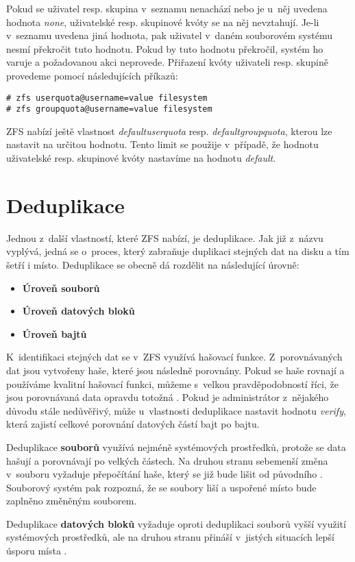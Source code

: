 Pokud se uživatel resp. skupina v~seznamu nenachází nebo je u~něj uvedena hodnota \emph{none}, uživatelské resp. skupinové kvóty se na něj nevztahují. Je-li v~seznamu uvedena jiná hodnota, pak uživatel v~daném souborovém systému nesmí překročit tuto hodnotu. Pokud by tuto hodnotu překročil, systém ho varuje a požadovanou akci neprovede. Přiřazení kvóty uživateli resp. skupině provedeme pomocí následujících příkazů:
\begin{verbatim}
# zfs userquota@username=value filesystem
# zfs groupquota@username=value filesystem
\end{verbatim}

ZFS nabízí ještě vlastnost \emph{defaultuserquota} resp. \emph{defaultgroupquota}, kterou lze nastavit na určitou hodnotu. Tento limit se použije v~případě, že hodnotu uživatelské resp. skupinové kvóty nastavíme na hodnotu \emph{default}.
\section{Deduplikace}
\label{dedup}
Jednou z~další vlastností, které ZFS nabízí, je deduplikace. Jak již z~názvu vyplývá, jedná se o~proces, který zabraňuje duplikaci stejných dat na disku a tím šetří i místo. Deduplikace se obecně dá rozdělit na následující úrovně:
\begin{itemize}
  \item \textbf{Úroveň souborů}
  \item \textbf{Úroveň datových bloků}
  \item \textbf{Úroveň bajtů}
\end{itemize}

K~identifikaci stejných dat se v~ZFS využívá hašovací funkce. Z~porovnávaných dat jsou vytvořeny haše, které jsou následně porovnány. Pokud se haše rovnají a používáme kvalitní hašovací funkci, můžeme s~velkou pravděpodobností říci, že jsou porovnávaná data opravdu totožná \cite{dedup}. Pokud je administrátor z~nějakého důvodu stále nedůvěřivý, může u~vlastnosti deduplikace nastavit hodnotu \emph{verify}, která zajistí celkové porovnání datových částí bajt po bajtu.

Deduplikace \textbf{souborů} využívá nejméně systémových prostředků, protože se data hašují a porovnávají po velkých částech. Na druhou stranu sebemenší změna v~souboru vyžaduje přepočítání haše, který se již bude lišit od původního \cite{dedup}. Souborový systém pak rozpozná, že se soubory liší a uspořené místo bude zaplněno změněným souborem.

Deduplikace \textbf{datových bloků} vyžaduje oproti deduplikaci souborů vyšší využití systémových prostředků, ale na druhou stranu přináší v~jistých situacích lepší úsporu místa \cite{dedup}.

